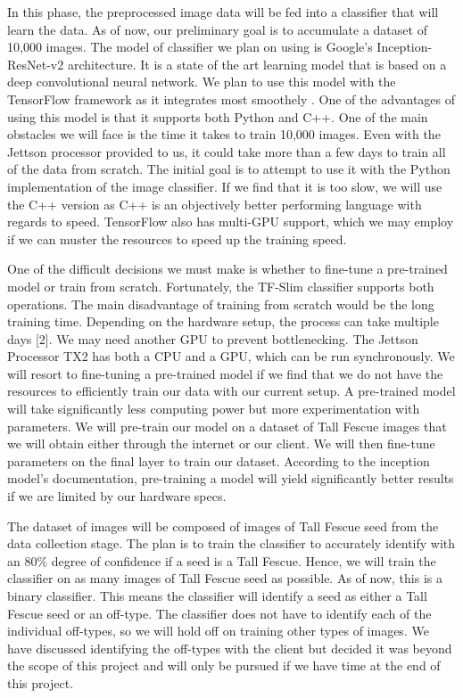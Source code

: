 \documentclass[onecolumn, draftclsnofoot,10pt, compsoc]{IEEEtran}
\begin{document}
In this phase, the preprocessed image data will be fed into a classifier that will learn the data. As of now, our preliminary goal is to accumulate a dataset of 10,000 images. The model of classifier we plan on using is Google's Inception-ResNet-v2 architecture. It is a state of the art learning model that is based on a deep convolutional neural network. We plan to use this model with the TensorFlow framework as it integrates most smoothely . One of the advantages of using this model is that it supports both Python and C++. One of the main obstacles we will face is the time it takes to train 10,000 images. Even with the Jettson processor provided to us, it could take more than a few days to train all of the data from scratch. The initial goal is to attempt to use it with the Python implementation of the image classifier. If we find that it is too slow, we will use the C++ version as C++ is an objectively better performing language with regards to speed. TensorFlow also has multi-GPU support, which we may employ if we can muster the resources to speed up the training speed.

One of the difficult decisions we must make is whether to fine-tune a pre-trained model or train from scratch. Fortunately, the TF-Slim classifier supports both operations. The main disadvantage of training from scratch would be the long training time. Depending on the hardware setup, the process can take multiple days [2]. We may need another GPU to prevent bottlenecking. The Jettson Processor TX2 has both a CPU and a GPU, which can be run synchronously. We will resort to fine-tuning a pre-trained model if we find that we do not have the resources to efficiently train our data with our current setup. A pre-trained model will take significantly less computing power but more experimentation with parameters. We will pre-train our model on a dataset of Tall Fescue images that we will obtain either through the internet or our client. We will then fine-tune parameters on the final layer to train our dataset. According to the inception model's documentation, pre-training a model will yield significantly better results if we are limited by our hardware specs. 

The dataset of images will be composed of images of Tall Fescue seed from the data collection stage. The plan is to train the classifier to accurately identify with an 80\% degree of confidence if a seed is a Tall Fescue. Hence, we will train the classifier on as many images of Tall Fescue seed as possible. As of now, this is a binary classifier. This means the classifier will identify a seed as either a Tall Fescue seed or an off-type. The classifier does not have to identify each of the individual off-types, so we will hold off on training other types of images. We have discussed identifying the off-types with the client but decided it was beyond the scope of this project and will only be pursued if we have time at the end of this project.
\end{document}
